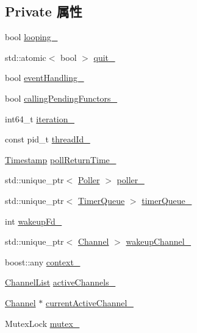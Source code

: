 \subsection*{Private 属性}
\begin{DoxyCompactItemize}
\item 
bool \hyperlink{classmuduo_1_1net_1_1EventLoop_a56192e02721abc39fdcc5fec930beb42}{looping\+\_\+}
\item 
std\+::atomic$<$ bool $>$ \hyperlink{classmuduo_1_1net_1_1EventLoop_a8554f10fb3372299f4ca373ca2b9d587}{quit\+\_\+}
\item 
bool \hyperlink{classmuduo_1_1net_1_1EventLoop_adde382716a55887e3b6e9cec9d615380}{event\+Handling\+\_\+}
\item 
bool \hyperlink{classmuduo_1_1net_1_1EventLoop_a5a34dfe17bae44f99e2c05ce2a952c90}{calling\+Pending\+Functors\+\_\+}
\item 
int64\+\_\+t \hyperlink{classmuduo_1_1net_1_1EventLoop_a53a6c00c183de568203f4b08bd01265d}{iteration\+\_\+}
\item 
const pid\+\_\+t \hyperlink{classmuduo_1_1net_1_1EventLoop_a34adb5b3e132d9207ceed3440b4f2ab1}{thread\+Id\+\_\+}
\item 
\hyperlink{classmuduo_1_1Timestamp}{Timestamp} \hyperlink{classmuduo_1_1net_1_1EventLoop_a9331500c7091e0eec7cb1e608897b0ed}{poll\+Return\+Time\+\_\+}
\item 
std\+::unique\+\_\+ptr$<$ \hyperlink{classmuduo_1_1Poller}{Poller} $>$ \hyperlink{classmuduo_1_1net_1_1EventLoop_ac17f6970520b102e74ab2b2f7af9f25c}{poller\+\_\+}
\item 
std\+::unique\+\_\+ptr$<$ \hyperlink{classmuduo_1_1TimerQueue}{Timer\+Queue} $>$ \hyperlink{classmuduo_1_1net_1_1EventLoop_a40c113cc3bf7ffc07732b4e5f3b365af}{timer\+Queue\+\_\+}
\item 
int \hyperlink{classmuduo_1_1net_1_1EventLoop_a14cd183489944d3bf82c0c1907eeaa30}{wakeup\+Fd\+\_\+}
\item 
std\+::unique\+\_\+ptr$<$ \hyperlink{classmuduo_1_1net_1_1Channel}{Channel} $>$ \hyperlink{classmuduo_1_1net_1_1EventLoop_abaa2284108c58f10907a1790f9373705}{wakeup\+Channel\+\_\+}
\item 
boost\+::any \hyperlink{classmuduo_1_1net_1_1EventLoop_a71712b023252fc8c769607fc03cce727}{context\+\_\+}
\item 
\hyperlink{classmuduo_1_1net_1_1EventLoop_a0b74248ffee6df294563618187b52404}{Channel\+List} \hyperlink{classmuduo_1_1net_1_1EventLoop_a9196549e63e60c1a0749ca09d7df6155}{active\+Channels\+\_\+}
\item 
\hyperlink{classmuduo_1_1net_1_1Channel}{Channel} $\ast$ \hyperlink{classmuduo_1_1net_1_1EventLoop_a5a06b3c43fd95fc703702cd92dee3b43}{current\+Active\+Channel\+\_\+}
\item 
Mutex\+Lock \hyperlink{classmuduo_1_1net_1_1EventLoop_a6e1bf1809a42f40f1a21178dc6620a6f}{mutex\+\_\+}
\end{DoxyCompactItemize}


